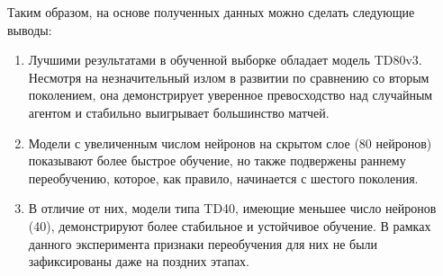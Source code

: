 Таким образом, на основе полученных данных можно сделать следующие выводы:
\begin{enumerate}
    \item Лучшими результатами в обученной выборке обладает модель TD80v3. Несмотря на незначительный излом в развитии по сравнению со вторым поколением, она демонстрирует уверенное превосходство над случайным агентом и стабильно выигрывает большинство матчей.
    \item Модели с увеличенным числом нейронов на скрытом слое (80 нейронов) показывают более быстрое обучение, но также подвержены раннему переобучению, которое, как правило, начинается с шестого поколения.
    \item В отличие от них, модели типа TD40, имеющие меньшее число нейронов (40), демонстрируют более стабильное и устойчивое обучение. В рамках данного эксперимента признаки переобучения для них не были зафиксированы даже на поздних этапах.
\end{enumerate}
